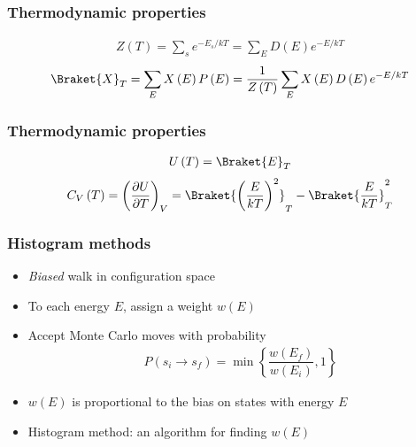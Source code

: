 \documentclass[xcolor=dvipsnames]{beamer}
\newcommand{\bk}{\Braket} %
\newcommand{\p}[1]{\left(#1\right)} %
\renewcommand{\set}[1]{\left\{#1\right\}} %
\newcommand{\f}[2]{\dfrac{#1}{#2}}
\renewcommand{\d}{\partial}
\let\olditem\item
\renewcommand{\item}{\setlength{\itemsep}{6pt}\olditem}
\begin{document}
\begin{frame}
  \frametitle{Thermodynamic properties}
  \begin{align*}
    Z\p{T}=\sum_se^{-E_s/kT}=\sum_ED\p{E}e^{-E/kT}
  \end{align*}
  \begin{align*}
    \bk{X}_T=\sum_EX\p{E}P\p{E}=\f1{Z\p{T}}\sum_EX\p{E}D\p{E}e^{-E/kT}
  \end{align*}
\end{frame}

\begin{frame}
  \frametitle{Thermodynamic properties}
  \begin{align*}
    U\p{T}=\bk{E}_T
  \end{align*}
  \begin{align*}
    C_V\p{T}=\p{\f{\d U}{\d T}}_V
    =\bk{\p{\f{E}{kT}}^2}_T-\bk{\f{E}{kT}}_T^2
  \end{align*}
\end{frame}


\begin{frame}
  \frametitle{Histogram methods}
  \begin{itemize}
  \item {\it Biased} walk in configuration space
  \item To each energy $E$, assign a weight $w\p{E}$
  \item Accept Monte Carlo moves with probability
    \begin{align*}
      P\p{s_i\to s_f}=\min\set{\f{w\p{E_f}}{w\p{E_i}},1}
    \end{align*}
  \item $w\p{E}$ is proportional to the bias on states with energy $E$
  \item Histogram method: an algorithm for finding $w\p{E}$
  \end{itemize}
\end{frame}
\end{document}

